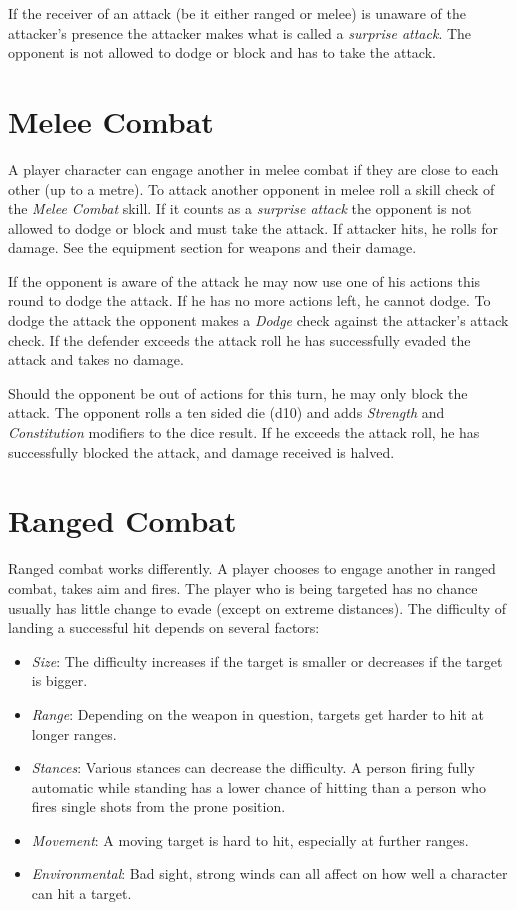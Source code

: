 If the receiver of an attack (be it either ranged or melee) is unaware of the
attacker's presence the attacker makes what is called a \emph{surprise attack}.
The opponent is not allowed to dodge or block and has to take the attack.

\section{Melee Combat}
\label{sec:6-Melee Combat}

A player character can engage another in melee combat if they are close to each
other (up to a metre). To attack another opponent in melee roll a skill check
of the \emph{Melee Combat} skill. If it counts as a \emph{surprise attack} the
opponent is not allowed to dodge or block and must take the attack. If attacker
hits, he rolls for damage. See the equipment section for weapons and their
damage.

If the opponent is aware of the attack he may now use one of his actions this
round to dodge the attack. If he has no more actions left, he cannot dodge. To
dodge the attack the opponent makes a \emph{Dodge} check against the attacker's
attack check. If the defender exceeds the attack roll he has successfully evaded
the attack and takes no damage.

Should the opponent be out of actions for this turn, he may only block the
attack. The opponent rolls a ten sided die (d10) and adds \emph{Strength} and
\emph{Constitution} modifiers to the dice result. If he exceeds the attack roll,
he has successfully blocked the attack, and damage received is halved.

\section{Ranged Combat}
\label{sec:6-Ranged Combat}

Ranged combat works differently. A player chooses to engage another in ranged
combat, takes aim and fires. The player who is being targeted has no chance
usually has little change to evade (except on extreme distances). The difficulty
of landing a successful hit depends on several factors:

\begin{itemize}
\item \emph{Size}: The difficulty increases if the target is smaller or
  decreases if the target is bigger.
\item \emph{Range}: Depending on the weapon in question, targets get harder to
  hit at longer ranges.
\item \emph{Stances}: Various stances can decrease the difficulty. A person
  firing fully automatic while standing has a lower chance of hitting than a
  person who fires single shots from the prone position.
\item \emph{Movement}: A moving target is hard to hit, especially at further
  ranges.
\item \emph{Environmental}: Bad sight, strong winds can all affect on how well
  a character can hit a target.
\end{itemize}

